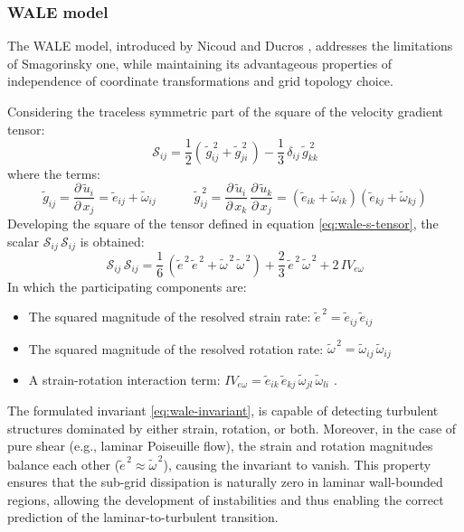 \documentclass[12pt, a4paper, twoside, openright]{book}
\begin{document}
\subsubsection{WALE model}
\label{sec:WALE}

The WALE model, introduced by Nicoud and Ducros \cite{wale}, addresses the limitations of Smagorinsky one, while maintaining its advantageous properties of independence of coordinate transformations and grid topology choice.

Considering the traceless symmetric part of the square of the velocity gradient tensor:
\begin{equation}
	\mathcal{S}_{ij} = \frac{1}{2} (\,\widetilde{g}_{ij}^{\,2} + \widetilde{g}_{ji}^{\,2}\,) - \frac{1}{3} \, \delta_{ij} \, \widetilde{g}_{kk}^{\,2}
	\label{eq:wale-s-tensor}
\end{equation}
where the terms:
\begin{equation}
	\widetilde{g}_{ij} = \frac{\partial \, \widetilde{u}_i}{\partial \, x_j} = \widetilde{e}_{ij} + \widetilde{\omega}_{ij}
	\qquad \quad
	\widetilde{g}_{ij}^{\,2} = \frac{\partial \, \widetilde{u}_i}{\partial \, x_k} \, \frac{\partial \, \widetilde{u}_k}{\partial \, x_j} = (\widetilde{e}_{ik} + \widetilde{\omega}_{ik})(\widetilde{e}_{kj} + \widetilde{\omega}_{kj})
\end{equation}
Developing the square of the tensor defined in equation \eqref{eq:wale-s-tensor}, the scalar $\mathcal{S}_{ij} \, \mathcal{S}_{ij}$ is obtained:
\begin{equation}
	\mathcal{S}_{ij} \, \mathcal{S}_{ij} = \frac{1}{6} \, (\widetilde{e}^{\,2} \, \widetilde{e}^{\,2} + \widetilde{\omega}^{\,2} \, \widetilde{\omega}^{\,2}) + \frac{2}{3} \, \widetilde{e}^{\,2} \, \widetilde{\omega}^{\,2} + 2 \, IV_{e\omega}
	\label{eq:wale-invariant}
\end{equation}
In which the participating components are:
\begin{itemize}
	\item The squared magnitude of the resolved strain rate: $\widetilde{e}^{\,2} = \widetilde{e}_{ij} \, \widetilde{e}_{ij}$
	\item The squared magnitude of the resolved rotation rate: $\widetilde{\omega}^{\,2} = \widetilde{\omega}_{ij} \, \widetilde{\omega}_{ij}$
	\item A strain-rotation interaction term: $IV_{e\omega} = \widetilde{e}_{ik} \, \widetilde{e}_{kj} \, \widetilde{\omega}_{jl} \,\widetilde{\omega}_{li}$ .
\end{itemize}
The formulated invariant \eqref{eq:wale-invariant}, is capable of detecting turbulent structures dominated by either strain, rotation, or both. Moreover, in the case of pure shear (e.g., laminar Poiseuille flow), the strain and rotation magnitudes balance each other ($\widetilde{e}^{\,2} \approx \widetilde{\omega}^{\,2}$), causing the invariant to vanish. This property ensures that the sub-grid dissipation is naturally zero in laminar wall-bounded regions, allowing the development of instabilities and thus enabling the correct prediction of the laminar-to-turbulent transition.
\end{document}
